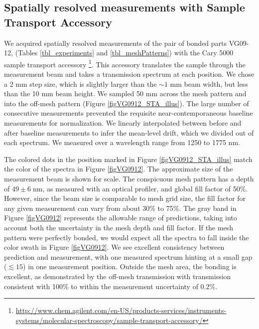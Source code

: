 \documentclass[osajnl,preprint,showpacs,superscriptaddress,12pt]{revtex4-1} %
\begin{document}
\subsection{Spatially resolved measurements with Sample Transport Accessory}
We acquired spatially resolved measurements of the pair of bonded parts VG09-12, (Tables \ref{tbl_experiments} and \ref{tbl_meshPatterns}) with the Cary 5000 sample transport accessory \footnote{\url{http://www.chem.agilent.com/en-US/products-services/instruments-systems/molecular-spectroscopy/sample-transport-accessory/}}.  This accessory translates the sample through the measurement beam and takes a transmission spectrum at each position.  We chose a 2 mm step size, which is slightly larger than the $\sim1$ mm beam width, but less than the 10 mm beam height.  We sampled 50 mm across the mesh pattern and into the off-mesh pattern (Figure \ref{figVG0912_STA_illus}).  The large number of consecutive measurements prevented the requisite near-contemporaneous baseline measurements for normalization.  We linearly interpolated between before and after baseline measurements to infer the mean-level drift, which we divided out of each spectrum.  We measured over a wavelength range from 1250 to 1775 nm.

The colored dots in the position marked in Figure \ref{figVG0912_STA_illus} match the color of the spectra in Figure \ref{figVG0912}.  The approximate size of the measurement beam is shown for scale.  The conspicuous mesh pattern has a depth of $49\pm6\;$nm, as measured with an optical profiler, and global fill factor of 50\%.  However, since the beam size is comparable to mesh grid size, the fill factor for any given measurement can vary from about 30\% to 75\%.  The gray band in Figure \ref{figVG0912} represents the allowable range of predictions, taking into account both the uncertainty in the mesh depth and fill factor.  If the mesh pattern were perfectly bonded, we would expect all the spectra to fall inside the color swath in Figure \ref{figVG0912}.  We see excellent consistency between prediction and measurement, with one measured spectrum hinting at a small gap ($\lesssim15$) in one measurement position.  Outside the mesh area, the bonding is excellent, as demonstrated by the off-mesh transmission with transmission consistent with 100\% to within the measurement uncertainty of 0.2\%.
\end{document}

